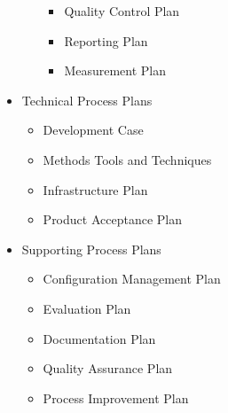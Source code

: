 \begin{itemize}
\begin{itemize}
\begin{itemize}
			\item Quality Control Plan
			\item Reporting Plan
			\item Measurement Plan
		\end{itemize}
	\end{itemize}
	\item Technical Process Plans
	\begin{itemize}
		\item Development Case
		\item Methods Tools and Techniques
		\item Infrastructure Plan
		\item Product Acceptance Plan
	\end{itemize}
	\item Supporting Process Plans
	\begin{itemize}
		\item Configuration Management Plan
		\item Evaluation Plan
		\item Documentation Plan
		\item Quality Assurance Plan
		\item Process Improvement Plan
	\end{itemize}
\end{itemize}
